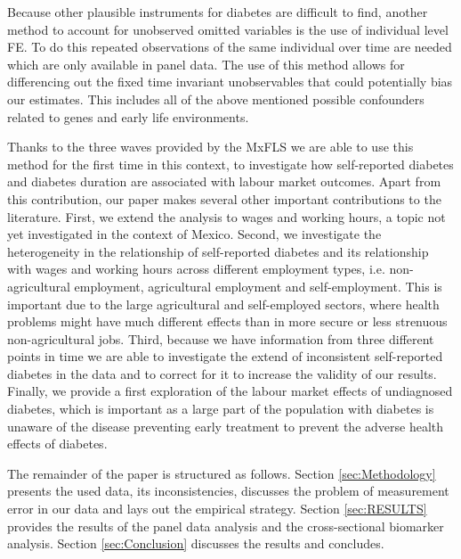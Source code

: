Because other plausible instruments for diabetes are difficult to
find, another method to account for unobserved omitted variables is
the use of individual level \ac{FE}. To do this repeated observations
of the same individual over time are needed which are only available
in panel data. The use of this method allows for differencing out
the fixed time invariant unobservables that could potentially bias
our estimates. This includes all of the above mentioned possible confounders
related to genes and early life environments.

Thanks to the three waves provided by the \ac{MxFLS} we are able
to use this method for the first time in this context, to investigate
how self-reported diabetes and diabetes duration are associated with
labour market outcomes. Apart from this contribution, our paper makes
several other important contributions to the literature. First, we
extend the analysis to wages and working hours, a topic not yet investigated
in the context of Mexico. Second, we investigate the heterogeneity
in the relationship of self-reported diabetes and its relationship
with wages and working hours across different employment types, i.e.
non-agricultural employment, agricultural employment and self-employment.
This is important due to the large agricultural and self-employed
sectors, where health problems might have much different effects than
in more secure or less strenuous non-agricultural jobs. Third, because
we have information from three different points in time we are able
to investigate the extend of inconsistent self-reported diabetes in
the data and to correct for it to increase the validity of our results.
Finally, we provide a first exploration of the labour market effects
of undiagnosed diabetes, which is important as a large part of the
population with diabetes is unaware of the disease preventing early
treatment to prevent the adverse health effects of diabetes.

The remainder of the paper is structured as follows. Section \ref{sec:Methodology}
presents the used data, its inconsistencies, discusses the problem
of measurement error in our data and lays out the empirical strategy.
Section \ref{sec:RESULTS} provides the results of the panel data
analysis and the cross-sectional biomarker analysis. Section \ref{sec:Conclusion}
discusses the results and concludes.

